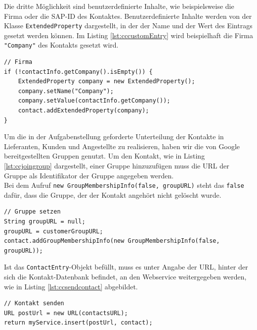 Die dritte Möglichkeit sind benutzerdefinierte Inhalte, wie beispielsweise die Firma oder die
 SAP-ID des Kontaktes.
Benutzerdefinierte Inhalte werden von der Klasse \lstinline{ExtendedProperty} dargestellt, in der
 der Name und der Wert des Eintrags gesetzt werden können.
Im Listing \ref{lst:cccustomEntry} wird beispielhaft die Firma \lstinline{"Company"} des Kontakts
 gesetzt wird.

\begin{lstlisting}[float=h!t]
// Firma
if (!contactInfo.getCompany().isEmpty()) {
	ExtendedProperty company = new ExtendedProperty();
	company.setName("Company");
	company.setValue(contactInfo.getCompany());
	contact.addExtendedProperty(company);
}
\end{lstlisting}

Um die in der Aufgabenstellung geforderte Unterteilung der Kontakte in Lieferanten, Kunden und
 Angestellte zu realisieren, haben wir die von Google bereitgestellten Gruppen genutzt.
Um den Kontakt, wie in Listing \ref{lst:ccjoingroup} dargestellt, einer Gruppe hinzuzufügen muss
 die URL der Gruppe als Identifikator der Gruppe angegeben werden.\\
Bei dem Aufruf \lstinline{new GroupMembershipInfo(false, groupURL)} steht das \lstinline{false}
 dafür, dass die Gruppe, der der Kontakt angehört nicht gelöscht wurde.

\begin{lstlisting}[float=h!t]
// Gruppe setzen
String groupURL = null;
groupURL = customerGroupURL;
contact.addGroupMembershipInfo(new GroupMembershipInfo(false, groupURL));
\end{lstlisting}

Ist das \lstinline{ContactEntry}-Objekt befüllt, muss es unter Angabe der URL, hinter der sich die
 Kontakt-Datenbank befindet, an den Webservice weitergegeben werden, wie in Listing
 \ref{lst:ccsendcontact} abgebildet.

\begin{lstlisting}[float=h!t]
// Kontakt senden		
URL postUrl = new URL(contactsURL);
return myService.insert(postUrl, contact);
\end{lstlisting}
\FloatBarrier